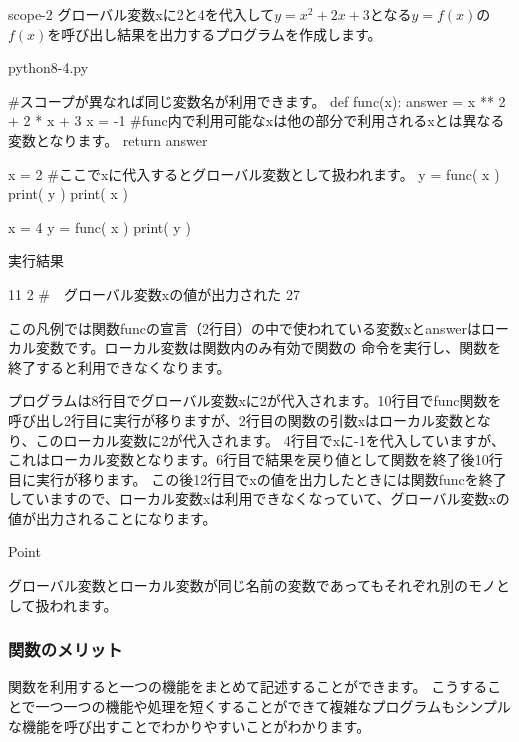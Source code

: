 \documentclass[11pt,a4paper,dvipdfmx,titlepage]{jsreport}
\begin{document}
\begin{pabox}{scope-2}
グローバル変数xに2と4を代入して$y = x^2 + 2 x + 3$となる$y = f(x)$の$f(x)$を呼び出し結果を出力するプログラムを作成します。


\begin{codebox}{python8-4.py}
\begin{listing}{1}
#スコープが異なれば同じ変数名が利用できます。
def func(x):
    answer = x ** 2 + 2 * x + 3
    x = -1
    #func内で利用可能なxは他の部分で利用されるxとは異なる変数となります。
    return answer

x = 2
#ここでxに代入するとグローバル変数として扱われます。
y = func( x )
print( y )
print( x ) 

x = 4
y = func( x )
print( y )
\end{listing}
実行結果
\begin{listing}{1}
11
2   #　グローバル変数xの値が出力された
27
\end{listing}
\end{codebox}
この凡例では関数funcの宣言（2行目）の中で使われている変数xとanswerはローカル変数です。ローカル変数は関数内のみ有効で関数の
命令を実行し、関数を終了すると利用できなくなります。

プログラムは8行目でグローバル変数xに2が代入されます。10行目でfunc関数を呼び出し2行目に実行が移りますが、2行目の関数の引数xはローカル変数となり、このローカル変数に2が代入されます。
4行目でxに-1を代入していますが、これはローカル変数となります。6行目で結果を戻り値として関数を終了後10行目に実行が移ります。
この後12行目でxの値を出力したときには関数funcを終了していますので、ローカル変数xは利用できなくなっていて、グローバル変数xの値が出力されることになります。

\end{pabox}
\begin{hipoint}{Point}

グローバル変数とローカル変数が同じ名前の変数であってもそれぞれ別のモノとして扱われます。

\end{hipoint}
\newpage
\subsubsection{関数のメリット}
関数を利用すると一つの機能をまとめて記述することができます。
こうすることで一つ一つの機能や処理を短くすることができて複雑なプログラムもシンプルな機能を呼び出すことでわかりやすいことがわかります。
\end{document}
